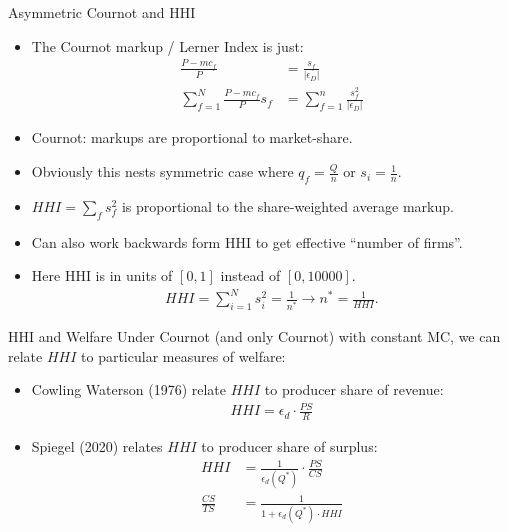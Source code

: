 \documentclass[aspectratio=169,10pt]{beamer}
\begin{document}
\begin{frame}{Asymmetric Cournot and HHI}
\begin{itemize}
\item The Cournot markup / Lerner Index is just:
\begin{align*}
\frac{P-mc_f}{P} &= \frac{s_f}{|\epsilon_D|}\\
\sum_{f=1}^N \frac{P - mc_f}{P} s_f &= \sum_{f=1}^n \frac{s_f^2}{|\epsilon_D|}
\end{align*}
\item Cournot: markups are proportional to market-share.
\item Obviously this nests symmetric case where $q_f = \frac{Q}{n}$ or $s_i = \frac{1}{n}$.
\item $HHI = \sum_f s_f^2$ is proportional to the \alert{share-weighted average markup}.
\item Can also work backwards form HHI to get effective ``number of firms''.
\item Here HHI is in units of $[0,1]$ instead of $[0,10000]$.
\begin{align*}
HHI = \sum_{i=1}^N s_i^2 = \frac{1}{n^*} \rightarrow n^{*} = \frac{1}{HHI}.
\end{align*}
\end{itemize}
\end{frame}



\begin{frame}{HHI and Welfare}
Under Cournot (and only Cournot) with constant MC, we can relate $HHI$ to particular measures of welfare:
\begin{itemize}
\item Cowling Waterson (1976) relate $HHI$ to producer share of revenue:
\begin{align*}
HHI =  \epsilon_d \cdot \frac{PS}{R}
\end{align*}
\item Spiegel (2020) relates $HHI$ to producer share of surplus:
\begin{align*}
HHI &=  \frac{1}{\epsilon_d \left(Q^{*}\right)} \cdot \frac{PS}{CS}\\
\frac{C S}{TS} &=\frac{1}{1+\epsilon_d \left(Q^{*}\right) \cdot HHI}
\end{align*}
\end{itemize}
\end{frame}
\end{document}
